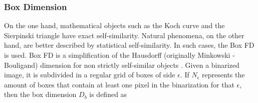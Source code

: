 
%
%

\subsubsection{Box Dimension}
\label{sec:3}
On the one hand, mathematical objects such as the Koch curve and the Sierpinski triangle have exact self-similarity. Natural phenomena, on the other hand, are better described by statistical self-similarity. In such cases, the Box FD is used. Box FD is a simplification of the Hausdorff (originally Minkowski - Bouligand) dimension for non strictly self-similar objects \cite{Peitgen2004}. Given a binarized image, it is subdivided in a regular grid of boxes of side $\epsilon$. If $N_{\epsilon}$ represents the amount of boxes that contain at least one pixel in the binarization for that $\epsilon$, then the box dimension  $D_{b}$ is defined as

